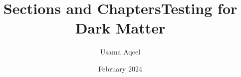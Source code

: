\documentclass[12pt]{report}
\title{Sections and Chapters}
\title{Testing for Dark Matter}
\author{Usama Aqeel}
\date{February 2024}
\numberwithin{equation}{subsection}
\numberwithin{figure}{subsection}
\numberwithin{equation}{section}
\numberwithin{figure}{section}
\theoremstyle{plain}
\begin{document}
\maketitle
\newpage
\tableofcontents
\newpage

\newpage 


\begin{appendices}



\end{appendices}
\end{document}
